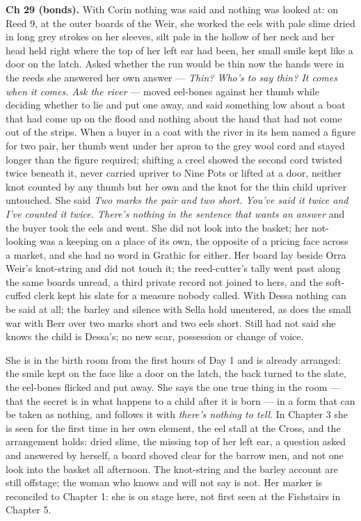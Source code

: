 \documentclass{design/chronicle}
\begin{document}
{\textbf{Ch 29 (bonds).} With Corin nothing was said and nothing was looked at: on Reed 9, at the outer boards of the Weir, she worked the eels with pale slime dried in long grey strokes on her sleeves, silt pale in the hollow of her neck and her head held right where the top of her left ear had been, her small smile kept like a door on the latch. Asked whether the run would be thin now the hands were in the reeds she answered her own answer — \emph{Thin? Who’s to say thin? It comes when it comes. Ask the river} — moved eel-bones against her thumb while deciding whether to lie and put one away, and said something low about a boat that had come up on the flood and nothing about the hand that had not come out of the strips. When a buyer in a coat with the river in its hem named a figure for two pair, her thumb went under her apron to the grey wool cord and stayed longer than the figure required; shifting a creel showed the second cord twisted twice beneath it, never carried upriver to Nine Pots or lifted at a door, neither knot counted by any thumb but her own and the knot for the thin child upriver untouched. She said \emph{Two marks the pair and two short. You’ve said it twice and I’ve counted it twice. There’s nothing in the sentence that wants an answer} and the buyer took the eels and went. She did not look into the basket; her not-looking was a keeping on a place of its own, the opposite of a pricing face across a market, and she had no word in Grathic for either. Her board lay beside Orra Weir’s knot-string and did not touch it; the reed-cutter’s tally went past along the same boards unread, a third private record not joined to hers, and the soft-cuffed clerk kept his slate for a measure nobody called. With Dessa nothing can be said at all; the barley and silence with Sella hold unentered, as does the small war with Berr over two marks short and two eels short. Still had not said she knows the child is Dessa’s; no new scar, possession or change of voice.

She is in the birth room from the first hours of Day 1 and is already arranged: the smile kept on the face like a door on the latch, the back turned to the slate, the eel-bones flicked and put away. She says the one true thing in the room --- that the secret is in what happens to a child after it is born --- in a form that can be taken as nothing, and follows it with \emph{there’s nothing to tell}. In Chapter 3 she is seen for the first time in her own element, the eel stall at the Cross, and the arrangement holds: dried slime, the missing top of her left ear, a question asked and answered by herself, a board shoved clear for the barrow men, and not one look into the basket all afternoon. The knot-string and the barley account are still offstage; the woman who knows and will not say is not. Her marker is reconciled to Chapter 1: she is on stage here, not first seen at the Fishstairs in Chapter 5.

}
\end{document}

